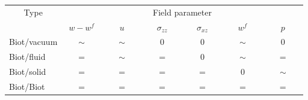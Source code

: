\begin{center}
\begin{tabular}{|l|cccccc|} \hline
\multicolumn{1}{|c|}{Type} & \multicolumn{6}{c|}{Field parameter} \\
\cline{2-7}
 & $w - w^f$ & $u$ & $\sigma_{zz}$ & $\sigma_{xz}$ & $w^f$ & $p$ \\
\hline
Biot/vacuum & $\sim$ & $\sim$ & 0 & 0 & $\sim$ & 0\\
Biot/fluid & = & $\sim$ & = & 0 & $\sim$ & = \\
Biot/solid & = & = & = & = & 0 & $\sim$ \\
Biot/Biot & ~~~=~~~ & ~~~=~~~ & ~~~=~~~ & ~~~=~~~ & ~~~=~~~
& ~~~=~~~ \\ \hline
\end{tabular}
\end{center}



